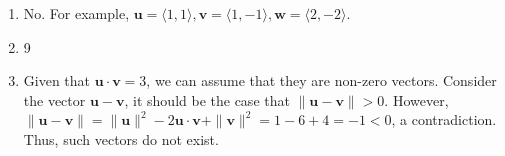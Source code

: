 \documentclass{article}
\newcommand{\vu}{\mathbf{u}}
\newcommand{\vv}{\mathbf{v}}
\newcommand{\vw}{\mathbf{w}}
\begin{document}
\begin{enumerate}
\begin{align*}
      \|\vu-\vv+\vv\|           & \le \|\vu-\vv\|+\|\vv\| \\
      \|\vu-\vv+\vv\| - \|\vv\| & \le \|\vu-\vv\|         \\
      \|\vu\| - \|\vv\|         & \le \|\vu-\vv\|         \\
      \|\vu-\vv\|               & \ge \|\vu\| - \|\vv\|
    \end{align*}
  \item No. For example, $\vu = \langle1, 1\rangle, \vv = \langle1, -1\rangle,
    \vw = \langle2, -2\rangle$.
    \setcounter{enumi}{65}
  \item 9
  \item Given that $\vu\cdot\vv=3$, we can assume that they are non-zero vectors. Consider the
    vector $\vu-\vv$, it should be the case that $\|\vu-\vv\|>0$. However, $\|\vu-\vv\|=
    \|\vu\|^2-2\vu\cdot\vv+\|\vv\|^2=1-6+4=-1<0$, a contradiction. Thus, such vectors do not
    exist.
\end{enumerate}
\end{document}

